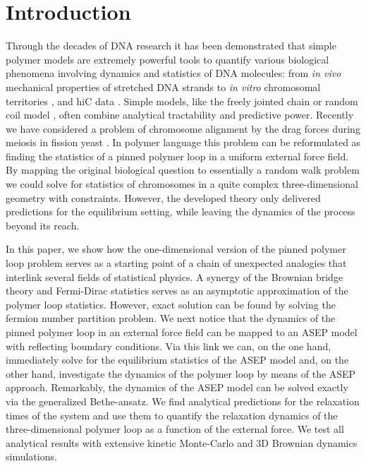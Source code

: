 \documentclass[aps,showpacs,twocolumn,floatfix,prx,superscriptaddress]{revtex4-1}
\begin{document}
\section{Introduction}
Through the decades of DNA research it has been demonstrated that simple polymer models are extremely powerful tools to quantify various biological phenomena involving dynamics and statistics of DNA molecules: from {\em in vivo} mechanical properties of stretched DNA strands \cite{} to {\em in vitro} chromosomal territories \cite{}, and hiC data \cite{}. Simple models, like the freely jointed chain or random coil model \cite{}, often combine analytical tractability and predictive power. Recently we have considered a problem of chromosome alignment by the drag forces during meiosis in fission yeast \cite{}. In polymer language this problem can be reformulated as finding the statistics of a pinned polymer loop in a uniform external force field. By mapping the original biological question to essentially a random walk problem we could solve for statistics of chromosomes in a quite complex three-dimensional geometry with constraints. However, the developed theory only delivered predictions for the equilibrium setting, while leaving the dynamics of the process beyond its reach. %

In this paper, we show how the one-dimensional version of the pinned polymer loop problem serves as a starting point of a chain of unexpected analogies that interlink several fields of statistical physics. A synergy of the Brownian bridge theory and Fermi-Dirac statistics serves as an asymptotic approximation of the polymer loop statistics. However, exact solution can be found by solving the fermion number partition problem. We next notice that the dynamics of the pinned polymer loop in an external force field can be mapped to an ASEP model with reflecting boundary conditions. Via this link we can, on the one hand, immediately solve for the equilibrium statistics of the ASEP model and, on the other hand, investigate the dynamics of the polymer loop by means of the ASEP approach. Remarkably, the dynamics of the ASEP model can be solved exactly via the generalized Bethe-ansatz. We find analytical predictions for the relaxation times of the system and use them to quantify the relaxation dynamics of the three-dimensional polymer loop as a function of the external force. We test all analytical results with extensive kinetic Monte-Carlo and 3D Brownian dynamics simulations. 
\end{document}
